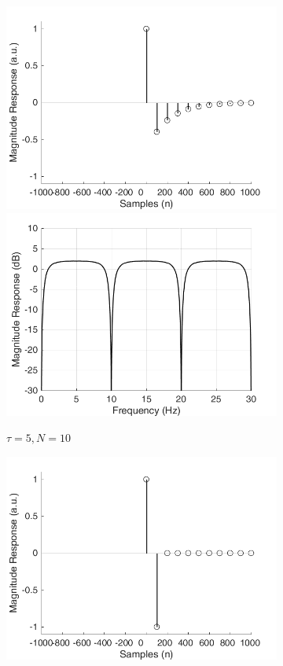 \documentclass[a4paper]{article}
\begin{document}
\begin{figure}[hbtp]
\begin{subfigure}{.245\textwidth}
        \includegraphics[width=\textwidth]{img/tau/kernel_exp_5.png}\\
        \includegraphics[width=\textwidth]{img/tau/mag_exp_5.png}
        \caption{$\tau=5, N=10$}\label{fig:ExpTau5}
    \end{subfigure}
    \begin{subfigure}{.245\textwidth}
        \includegraphics[width=\textwidth]{img/tau/kernel_exp_100.png}\\

\end{subfigure}
\end{figure}
\end{document}
